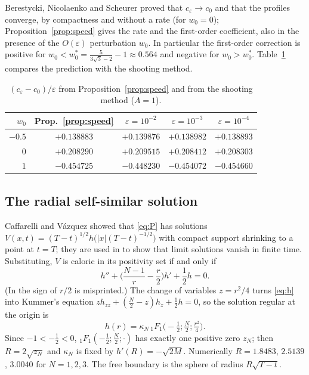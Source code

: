 \documentclass[11pt]{amsart}
\theoremstyle{remark}
\newcommand{\ve}{\varepsilon}
\begin{document}
Berestycki, Nicolaenko and Scheurer proved that $c_\ve\to c_0$ and that the
profiles converge, by compactness and without a rate
\cite[Thm.~5.2]{BerestyckiNicolaenkoScheurer1985} (for $w_0=0$);
Proposition~\ref{prop:speed} gives the rate and the first-order coefficient,
also in the presence of the $O(\ve)$ perturbation $w_0$.
In particular the first-order correction is positive for
$w_0<w_0^*=\frac5{3\sqrt3-2}-1\approx0.564$ and negative for $w_0>w_0^*$.
Table~\ref{tab:speedcoef} compares the prediction with the shooting method.

\begin{table}[h]
\centering
\begin{tabular}{rcccc}
\toprule
$w_0$ & Prop.~\ref{prop:speed} & $\ve=10^{-2}$ & $\ve=10^{-3}$ & $\ve=10^{-4}$\\
\midrule
$-0.5$ & $+0.138883$ & $+0.139876$ & $+0.138982$ & $+0.138893$\\
$0$    & $+0.208290$ & $+0.209515$ & $+0.208412$ & $+0.208303$\\
$1$    & $-0.454725$ & $-0.448230$ & $-0.454072$ & $-0.454660$\\
\bottomrule
\end{tabular}
\caption{$(c_\ve-c_0)/\ve$ from Proposition~\ref{prop:speed} and from the
shooting method ($A=1$).}\label{tab:speedcoef}
\end{table}

\subsection{The radial self-similar solution}
Caffarelli and V\'azquez \cite{CaffarelliVazquez1995} showed that \eqref{eq:P}
has solutions $V(x,t)=(T-t)^{1/2}h\big(|x|(T-t)^{-1/2}\big)$ with compact
support shrinking to a point at $t=T$; they are used in \cite[Prop.~4.3]{FernandezBonderWolanski2004}
to show that limit solutions vanish in finite time. Substituting,
$V$ is caloric in its positivity set if and only if
\begin{equation}\label{eq:h}
h''+\Big(\frac{N-1}r-\frac r2\Big)h'+\frac12h=0.
\end{equation}
(In \cite[(4.6)]{FernandezBonderWolanski2004} the sign of $r/2$ is misprinted.) The change of
variables $z=r^2/4$ turns \eqref{eq:h} into Kummer's equation
$zh_{zz}+(\frac N2-z)h_z+\frac12h=0$, so the solution regular at the origin is
\[
h(r)=\kappa_N\,{}_1F_1\big(-\tfrac12;\tfrac N2;\tfrac{r^2}4\big).
\]
Since $-1<-\frac12<0$, ${}_1F_1(-\frac12;\frac N2;\cdot)$ has exactly one
positive zero $z_N$; then $R=2\sqrt{z_N}$ and $\kappa_N$ is fixed by
$h'(R)=-\sqrt{2M}$. Numerically $R=1.8483$, $2.5139$, $3.0040$ for $N=1,2,3$.
The free boundary is the sphere of radius $R\sqrt{T-t}$.
\end{document}
